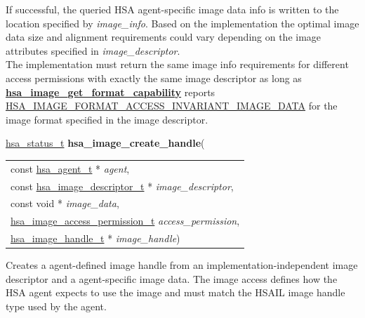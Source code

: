 \documentclass[final]{book}
\newcommand{\hsaarg}[1]{\textit{#1}}
\newcommand{\reffun}[1]{\textbf{#1}}
\begin{document}
\begin{appendices}
If successful, the queried HSA agent-specific image data info is written to the location specified by \textit{image_info}. Based on the implementation the optimal image data size and alignment requirements could vary depending on the image attributes specified in \textit{image_descriptor}.\\[2mm]
The implementation must return the same image info requirements for different access permissions with exactly the same image descriptor as long as \hyperlink{group--images-1ga48e525e1be37d9ac4e4f6f6a422b3b11}{\reffun{hsa_image_get_format_capability}} reports \hyperlink{group--images-1ggab8be837beba5ecf84b757d5a5c1b80d5a8a70c7d8e7727e621217a246d38e4f0b}{HSA_IMAGE_FORMAT_ACCESS_INVARIANT_IMAGE_DATA} for the image format specified in the image descriptor. 


\noindent\begin{tcolorbox}[breakable,nobeforeafter,colframe=white,colback=lightgray,left=0mm]
\hyperlink{group--status-1gad755322e7ff95456520e8abdbe90d225}{hsa_status_t} \hypertarget{group--images-1gad80ea369867549c5b313c08134beec83}{\textbf{hsa_image_create_handle}}(
\vspace{-3.5mm}\begin{longtable}{@{}p{\textwidth}}
\hspace{1.7em}const \hyperlink{group--topology-1gab8db3fb886332a24acac08ec361e1d86}{hsa_agent_t} * \hsaarg{agent},\\
\hspace{1.7em}const \hyperlink{group--images-1ga92eb44fcaceb4f1b16dfc9b655bc6f3b}{hsa_image_descriptor_t} * \hsaarg{image_descriptor},\\
\hspace{1.7em}const void * \hsaarg{image_data},\\
\hspace{1.7em}\hyperlink{group--images-1gab28dbe36c6c4d5186034af5d6cc20dea}{hsa_image_access_permission_t} \hsaarg{access_permission},\\
\hspace{1.7em}\hyperlink{group--images-1ga0aeecea8e818df4cec2eccb3a5e85d5f}{hsa_image_handle_t} * \hsaarg{image_handle})\end{longtable}

\end{tcolorbox}
Creates a agent-defined image handle from an implementation-independent image descriptor and a agent-specific image data. The image access defines how the HSA agent expects to use the image and must match the HSAIL image handle type used by the agent.


\end{appendices}
\end{document}
